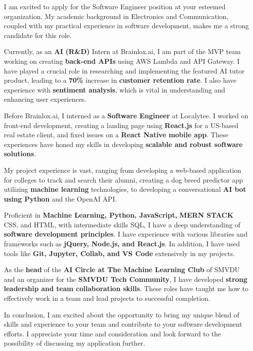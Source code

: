 I am excited to apply for the Software Engineer position at your esteemed organization. My academic background in Electronics and Communication, coupled with my practical experience in software development, makes me a strong candidate for this role.

Currently, as an \textbf{AI (R\&D)} Intern at Brainlox.ai, I am part of the MVP team working on creating \textbf{back-end APIs} using AWS Lambda and API Gateway. I have played a crucial role in researching and implementing the featured AI tutor product, leading to a \textbf{70\%} increase in \textbf{customer retention rate}. I also have experience with \textbf{sentiment analysis}, which is vital in understanding and enhancing user experiences.

Before Brainlox.ai, I interned as a \textbf{Software Engineer} at Localytee. I worked on front-end development, creating a landing page using \textbf{React.js} for a US-based real estate client, and fixed issues on a \textbf{React Native mobile app}. These experiences have honed my skills in developing \textbf{scalable and robust software solutions}.

My project experience is vast, ranging from developing a web-based application for colleges to track and search their alumni, creating a dog breed predictor app utilizing \textbf{machine learning} technologies, to developing a conversational \textbf{AI bot using Python} and the OpenAI API.

Proficient in \textbf{Machine Learning, Python, JavaScript,} \textbf{MERN STACK} CSS, and HTML, with intermediate skills SQL, I have a deep understanding of \textbf{software development principles}. I have experience with various libraries and frameworks such as \textbf{jQuery, Node.js, and React.js}. In addition, I have used tools like \textbf{Git, Jupyter, Collab, and VS Code} extensively in my projects.

As the \textbf{head} of the \textbf{AI Circle at The Machine Learning Club} of SMVDU and an organizer for the \textbf{SMVDU Tech Community}, I have developed \textbf{strong leadership and team collaboration skills}. These roles have taught me how to effectively work in a team and lead projects to successful completion.

In conclusion, I am excited about the opportunity to bring my unique blend of skills and experience to your team and contribute to your software development efforts. I appreciate your time and consideration and look forward to the possibility of discussing my application further.
